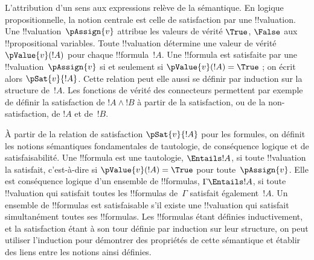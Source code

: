 \documentclass[../../../include/open-logic-section]{subfiles}
\begin{document}
L'attribution d'un sens aux expressions relève de la sémantique. En
logique propositionnelle, la notion centrale est celle de satisfaction
par une !!{valuation}. Une !!{valuation}~$\pAssign{v}$ attribue les
valeurs de vérité $\True$, $\False$ aux !!{propositional variable}s.
Toute !!{valuation} détermine une valeur de vérité $\pValue{v}(!A)$
pour chaque !!{formula}~$!A$. Une !!{formula} est satisfaite par une
!!{valuation}~$\pAssign{v}$ si et seulement si
$\pValue{v}(!A) = \True$ ; on écrit alors $\pSat{v}{!A}$.
Cette relation peut elle aussi se définir par induction sur la
structure de~$!A$. Les fonctions de vérité des connecteurs permettent
par exemple de définir la satisfaction de $!A \land !B$ à partir de
la satisfaction, ou de la non-satisfaction, de $!A$ et de~$!B$.

À partir de la relation de satisfaction $\pSat{v}{!A}$ pour les
formules, on définit les notions sémantiques fondamentales de
tautologie, de conséquence logique et de satisfaisabilité.
Une !!{formula} est une tautologie, $\Entails !A$, si toute
!!{valuation} la satisfait, c'est-à-dire si $\pValue{v}(!A) = \True$
pour toute~$\pAssign{v}$. Elle est conséquence logique d'un ensemble
de !!{formula}s, $\Gamma \Entails !A$, si toute !!{valuation} qui
satisfait toutes les !!{formula}s de~$\Gamma$ satisfait également~$!A$.
Un ensemble de !!{formula}s est satisfaisable s'il existe une
!!{valuation} qui satisfait simultanément toutes ses !!{formula}s.
Les !!{formula}s étant définies inductivement, et la satisfaction
étant à son tour définie par induction sur leur structure, on peut
utiliser l'induction pour démontrer des propriétés de cette sémantique
et établir des liens entre les notions ainsi définies.
\end{document}

